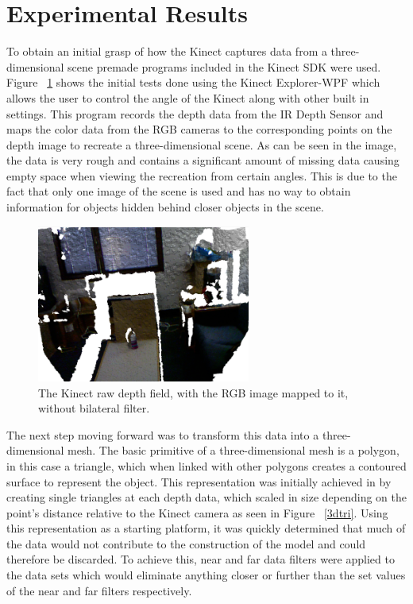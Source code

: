 \documentclass[pdftex,10.5pt]{report}
\begin{document}
\section{Experimental Results}
To obtain an initial grasp of how the Kinect captures data from a three-dimensional scene premade programs included in the Kinect SDK were used. Figure ~\ref{waterbot}  shows the initial tests done using the Kinect Explorer-WPF which allows the user to control the angle of the Kinect along with other built in settings. This program records the depth data from the IR Depth Sensor and maps the color data from the RGB cameras to the corresponding points on the depth image to recreate a three-dimensional scene. As can be seen in the image, the data is very rough and contains a significant amount of missing data causing empty space when viewing the recreation from certain angles. This is due to the fact that only one image of the scene is used and has no way to obtain information for objects hidden behind closer objects in the scene.

\begin{figure}[H]
	\centering
	\includegraphics[width=70mm]{figures/kinectwaterbottle.png}
	\caption{The Kinect raw depth field, with the RGB image mapped to it, without bilateral filter.}
	\label{waterbot}
\end{figure}

The next step moving forward was to transform this data into a three-dimensional mesh. The basic primitive of a three-dimensional mesh is a polygon, in this case a triangle, which when linked with other polygons creates a contoured surface to represent the object. This representation was initially achieved in by creating single triangles at each depth data, which scaled in size depending on the point's distance relative to the Kinect camera as seen in Figure ~\ref{3dtri}. Using this representation as a starting platform, it was quickly determined that much of the data would not contribute to the construction of the model and could therefore be discarded. To achieve this, near and far data filters were applied to the data sets which would eliminate anything closer or further than the set values of the near and far filters respectively.
\end{document}
